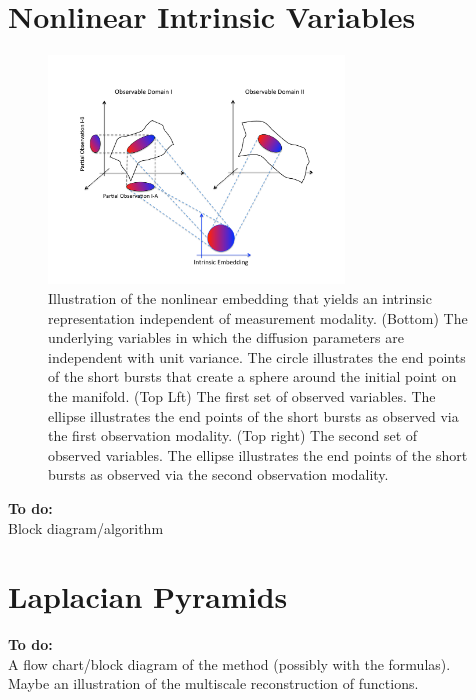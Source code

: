 \documentclass[twocolumn]{revtex4}
\begin{document}
\section{Nonlinear Intrinsic Variables} \label{sec:NIV}

\begin{figure}[ht]
\includegraphics[width=0.7\textwidth]{IntrinsicEmbeddingIllustration2.pdf}
\caption{Illustration of the nonlinear embedding that yields an intrinsic representation independent of measurement modality. (Bottom) The underlying variables in which the diffusion parameters are independent with unit variance. The circle illustrates the end points of the short bursts that create a sphere around the initial point on the manifold. (Top Lft) The first set of observed variables. The ellipse illustrates the end points of the short bursts as observed via the first observation modality. (Top right) The second set of observed variables. The ellipse illustrates the end points of the short bursts as observed via the second observation modality.}
\end{figure}

{\bf To do:} \\
Block diagram/algorithm

\section{Laplacian Pyramids} \label{sec:LapPyr}

{\bf To do:} \\
A flow chart/block diagram of the method (possibly with the formulas).\\
Maybe an illustration of the multiscale reconstruction of functions.
\end{document}
